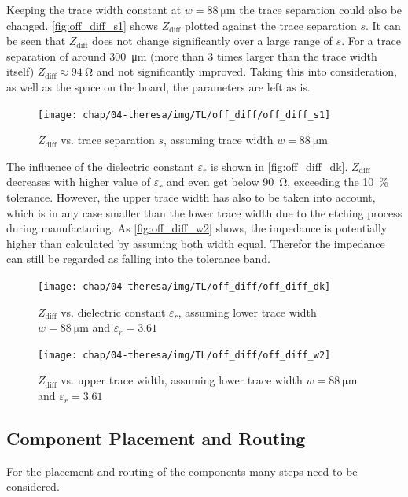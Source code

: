 Keeping the trace width constant at $w = \SI{88}{\micro \meter}$ the trace separation could also be changed.
\autoref{fig:off_diff_s1} shows $Z_\text{diff}$ plotted against the trace separation $s$.
It can be seen that $Z_\text{diff}$ does not change significantly over a large range of $s$.
For a trace separation of around \SI{300}{\micro \meter} (more than 3 times larger than the trace width itself) $Z_\text{diff} \approx \SI{94}{\ohm}$ and not significantly improved.
Taking this into consideration, as well as the space on the board, the parameters are left as is.  
\begin{figure}[tbh]
	\centering
	\texttt{[image: chap/04-theresa/img/TL/off\_diff/off\_diff\_s1]}
	\caption[DOWG, $Z_\text{diff}$ vs. $s$]{$Z_\text{diff}$ vs. trace separation $s$, assuming trace width $w = \SI{88}{\micro \meter}$}
	\label{fig:off_diff_s1}
\end{figure}

The influence of the dielectric constant $\varepsilon_r$ is shown in \autoref{fig:off_diff_dk}. 
$Z_\text{diff}$ decreases with higher value of $\varepsilon_r$ and even get below \SI{90}{\ohm}, exceeding the \SI{10}{\percent} tolerance.
However, the upper trace width has also to be taken into account, which is in any case smaller than the lower trace width due to the etching process during manufacturing.
As \autoref{fig:off_diff_w2} shows, the impedance is potentially higher than calculated by assuming both width equal. Therefor the impedance can still be regarded as falling into the tolerance band.
\begin{figure}[tbh]
	\centering
	\texttt{[image: chap/04-theresa/img/TL/off\_diff/off\_diff\_dk]}
	\caption[DOWG, $Z_\text{diff}$ vs. $\varepsilon_r$]{$Z_\text{diff}$ vs. dielectric constant $\varepsilon_r$, assuming lower trace width $w = \SI{88}{\micro \meter}$ and $\varepsilon_r = 3.61$}
	\label{fig:off_diff_dk}
\end{figure}


\begin{figure}[tbh]
	\centering
	\texttt{[image: chap/04-theresa/img/TL/off\_diff/off\_diff\_w2]}
	\caption[DOWG, $Z_\text{diff}$ vs. upper trace width]{$Z_\text{diff}$ vs. upper trace width, assuming lower trace width $w = \SI{88}{\micro \meter}$ and $\varepsilon_r = 3.61$}
	\label{fig:off_diff_w2}
\end{figure}



\subsection{Component Placement and Routing}
For the placement and routing of the components many steps need to be considered.

